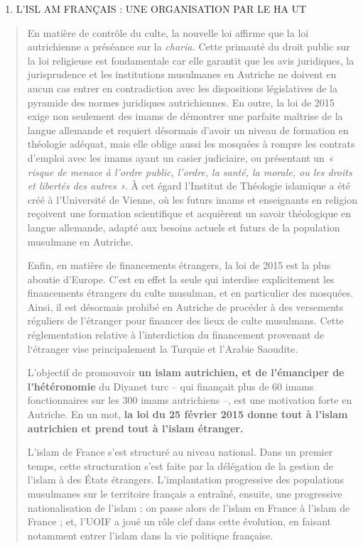 \begin{enumerate}
\def\labelenumi{\Roman{enumi}.}
\setcounter{enumi}{1}
\item
  L'ISL AM FRANÇAIS : UNE ORGANISATION PAR LE HA UT
\end{enumerate}

\begin{quote}
En matière de contrôle du culte, la nouvelle loi affirme que la loi
autrichienne a préséance sur la \emph{charia.} Cette primauté du droit
public sur la loi religieuse est fondamentale car elle garantit que les
avis juridiques, la jurisprudence et les institutions musulmanes en
Autriche ne doivent en aucun cas entrer en contradiction avec les
dispositions législatives de la pyramide des normes juridiques
autrichiennes. En outre, la loi de 2015 exige non seulement des imams de
démontrer une parfaite maîtrise de la langue allemande et requiert
désormais d'avoir un niveau de formation en théologie adéquat, mais elle
oblige aussi les mosquées à rompre les contrats d'emploi avec les imams
ayant un casier judiciaire, ou présentant un \emph{« risque de menace à
l'ordre public, l'ordre, la santé, la morale, ou les droits et libertés
des autres ».} À cet égard l'Institut de Théologie islamique a été créé
à l'Université de Vienne, où les futurs imams et enseignants en religion
reçoivent une formation scientifique et acquièrent un savoir théologique
en langue allemande, adapté aux besoins actuels et futurs de la
population musulmane en Autriche.

Enfin, en matière de financements étrangers, la loi de 2015 est la plus
aboutie d'Europe. C'est en effet la seule qui interdise explicitement
les financements étrangers du culte musulman, et en particulier des
mosquées. Ainsi, il est désormais prohibé en Autriche de procéder à des
versements réguliers de l'étranger pour financer des lieux de culte
musulmans. Cette réglementation relative à l'interdiction du financement
provenant de l`étranger vise principalement la Turquie et l'Arabie
Saoudite.

L'objectif de promouvoir \textbf{un islam autrichien, et de l'émanciper
de l'hétéronomie} du Diyanet turc -- qui finançait plus de 60 imams
fonctionnaires sur les 300 imams autrichiens --, est une motivation
forte en Autriche. En un mot, \textbf{la loi du 25 février 2015 donne
tout à l'islam autrichien et prend tout à l'islam étranger.}

L'islam de France s'est structuré au niveau national. Dans un premier
temps, cette structuration s'est faite par la délégation de la gestion
de l'islam à des États étrangers. L'implantation progressive des
populations musulmanes sur le territoire français a entraîné, ensuite,
une progressive nationalisation de l'islam : on passe alors de l'islam
en France à l'islam de France ; et, l'UOIF a joué un rôle clef dans
cette évolution, en faisant notamment entrer l'islam dans la vie
politique française.




\end{quote}
